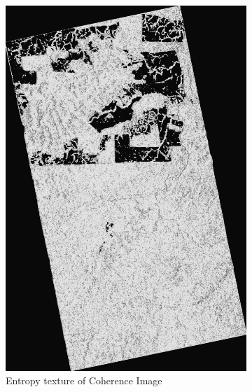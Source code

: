 \begin{figure}[H]
\begin{subfigure}[b]{0.4\linewidth}
    \includegraphics[width=\linewidth]{Chapter4/glcm_textures/entropyimage.png}
    \caption{Entropy texture of Coherence Image}
  \end{subfigure}
  \begin{subfigure}[b]{0.4\linewidth}

\end{subfigure}
\end{figure}
